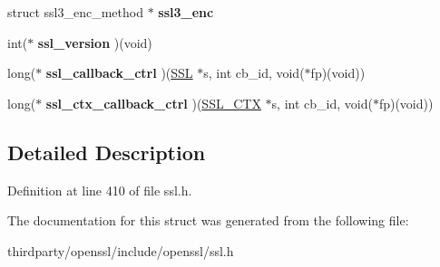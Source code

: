 \begin{DoxyCompactItemize}
\mbox{\label{structssl__method__st_aa9b5c4c60c391bc6771bd035aa10ce0a}} 
struct ssl3\+\_\+enc\+\_\+method $\ast$ {\bfseries ssl3\+\_\+enc}
\item 
\mbox{\label{structssl__method__st_a84b47953e71129319b367394a6daca4b}} 
int($\ast$ {\bfseries ssl\+\_\+version} )(void)
\item 
\mbox{\label{structssl__method__st_ac8ad5e3ad9b93cad8439c0af2c280c56}} 
long($\ast$ {\bfseries ssl\+\_\+callback\+\_\+ctrl} )(\hyperlink{structssl__st}{S\+SL} $\ast$s, int cb\+\_\+id, void($\ast$fp)(void))
\item 
\mbox{\label{structssl__method__st_a993fb1170221e955a38978690bbfde45}} 
long($\ast$ {\bfseries ssl\+\_\+ctx\+\_\+callback\+\_\+ctrl} )(\hyperlink{structssl__ctx__st}{S\+S\+L\+\_\+\+C\+TX} $\ast$s, int cb\+\_\+id, void($\ast$fp)(void))
\end{DoxyCompactItemize}


\subsection{Detailed Description}


Definition at line 410 of file ssl.\+h.



The documentation for this struct was generated from the following file\+:\begin{DoxyCompactItemize}
\item 
thirdparty/openssl/include/openssl/ssl.\+h\end{DoxyCompactItemize}
